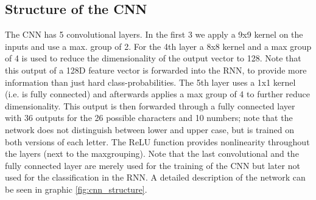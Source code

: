 \documentclass{utue} %
\begin{document}
\subsection{Structure of the CNN}
The CNN has 5 convolutional layers. In the first 3 we apply a 9x9 kernel on the inputs and use a max. group of 2. For the 4th layer a 8x8 kernel and a max group of 4 is used to reduce the dimensionality of the output vector to 128. Note that this output of a 128D feature vector is forwarded into the RNN, to provide more information than just hard class-probabilities. The 5th layer uses a 1x1 kernel %
(i.e. is fully connected) and afterwards applies a max group of 4 to further reduce dimensionality. This output is then forwarded through a fully connected layer with 36 outputs for the 26 possible characters and 10 numbers; note that the network does not distinguish between lower and upper case, but is trained on both versions of each letter. The ReLU function provides nonlinearity throughout the layers (next to the maxgrouping). Note that the last convolutional and the fully connected layer are merely used for the training of the CNN but later not used for the classification in the RNN. A detailed description of the network can be seen in graphic \ref{fig:cnn_structure}.
\end{document}
